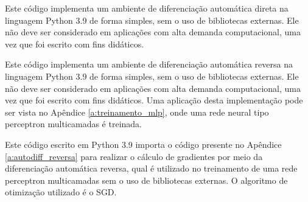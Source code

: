  \label{a:autodiff_direta}

  Este código implementa um ambiente de diferenciação automática direta na linguagem Python 3.9 de forma simples, sem o uso de bibliotecas externas. Ele não deve ser considerado em aplicações com alta demanda computacional, uma vez que foi escrito com fins didáticos.

  


 \label{a:autodiff_reversa}

  Este código implementa um ambiente de diferenciação automática reversa na linguagem Python 3.9 de forma simples, sem o uso de bibliotecas externas. Ele não deve ser considerado em aplicações com alta demanda computacional, uma vez que foi escrito com fins didáticos. Uma aplicação desta implementação pode ser vista no Apêndice \ref{a:treinamento_mlp}, onde uma rede neural tipo perceptron multicamadas é treinada.

  


 \label{a:treinamento_mlp}

  Este código escrito em Python 3.9 importa o código presente no Apêndice \ref{a:autodiff_reversa} para realizar o cálculo de gradientes por meio da diferenciação automática reversa, qual é utilizado no treinamento de uma rede perceptron multicamadas sem o uso de bibliotecas externas. O algoritmo de otimização utilizado é o SGD.

  
